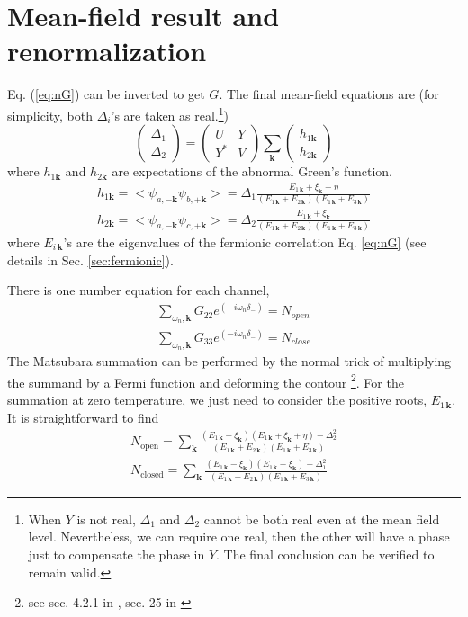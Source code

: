 \documentclass[reprint,pra]{revtex4-1}
\newcommand{\vk}{\ensuremath{\mathbf{k}}}
\newcommand{\mtrx}[1]{\ensuremath{\begin{pmatrix}#1\end{pmatrix}}}
\newcommand{\av}[1]{\ensuremath{\bigl<{#1}\bigr>}}
\begin{document}
\section{Mean-field result and renormalization\label{sec:mean}}
 Eq. (\ref{eq:nG}) can be inverted to get $G$.   The final mean-field equations are (for simplicity,  both $\Delta_{i}$'s are taken as real.\footnote{\label{foot:pathInt2:real}When $Y$ is not real, $\Delta_{1}$ and $\Delta_{2}$ cannot be both real even at the mean field level.  Nevertheless, we can require one  real, then the other will have a phase just to compensate the phase in $Y$.  The final conclusion can be verified to remain valid.   }) 
  \begin{equation}\label{eq:pathInt2:mf}
\mtrx{\Delta_1\\\Delta_2}=\mtrx{U&Y\\Y^{*}&V}\sum_{\vk}\mtrx{h_{1\vk}\\h_{2\vk}}
\end{equation}
  where $ h_{1\vk}$ and $ h_{2\vk}$ are expectations of the abnormal Green's function.
  \begin{gather}
  h_{1\vk}=\av{\psi_{a,-{\vk}}\psi_{b,+{\vk}}}
  =\Delta_{1}\frac{E_{1\,\vk}+\xi_{\vk}+\eta}{(E_{1\,\vk}+E_{2\,\vk})(E_{1\,\vk}+E_{3\,\vk})}\label{eq:pathInt2:h1}\\
  h_{2\vk}=\av{\psi_{a,-{\vk}}\psi_{c,+{\vk}}}
  =\Delta_{2}\frac{E_{1\,\vk}+\xi_{\vk}}{(E_{1\,\vk}+E_{2\,\vk})(E_{1\,\vk}+E_{3\,\vk})}\label{eq:pathInt2:h2}
  \end{gather}
   where  $E_{i\,\vk}$'s are the eigenvalues of the fermionic correlation Eq. \ref{eq:nG} (see details in Sec. \ref{sec:fermionic}). 
   
   There is one  number equation for each channel,  
\begin{gather*}
\sum_{\omega_{n}, \vk}G_{22}e^{(-i\omega_n\delta_-)}=N_{open}\\
\sum_{\omega_{n},\vk}G_{33}e^{(-i\omega_n\delta_-)}=N_{close}
\end{gather*}
 The Matsubara summation can be performed by the normal trick of multiplying the summand by a Fermi function and deforming the contour \footnote{see sec. 4.2.1 in \cite{Altland}, sec. 25 in \cite{Fetter}}.  For the summation at zero temperature, we just need to consider the positive roots, $E_{1\,\vk}$.  It is straightforward to find 
\begin{gather}
N_{\text{open}}=\sum_{\vk}\frac{(E_{1\,\vk}-\xi_{\vk})(E_{1\,\vk}+\xi_{\vk}+\eta)-\Delta_2^2}{(E_{1\,\vk}+E_{2\,\vk})(E_{1\,\vk}+E_{3\,\vk})}
\label{eq:pathInt2:numOpen}\\
N_{\text{closed}}=\sum_{\vk}\frac{(E_{1\,\vk}-\xi_{\vk})(E_{1\,\vk}+\xi_{\vk})-\Delta_1^2}{(E_{1\,\vk}+E_{2\,\vk})(E_{1\,\vk}+E_{3\,\vk})}
\label{eq:pathInt2:numClose}
\end{gather}
\end{document}
